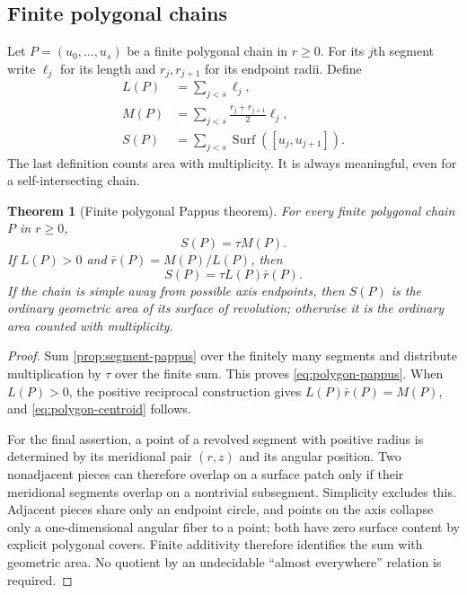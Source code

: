 \documentclass[11pt]{article}
\newtheorem{theorem}{Theorem}[section]
\theoremstyle{definition}
\newcommand{\Surf}{\operatorname{Surf}}
\begin{document}
\subsection{Finite polygonal chains}

Let $P=(u_0,\ldots,u_s)$ be a finite polygonal chain in $r\geq0$.  For its
$j$th segment write $\ell_j$ for its length and $r_j,r_{j+1}$ for its endpoint
radii.  Define
\begin{align}
 L(P)&=\sum_{j<s}\ell_j,\label{eq:poly-length}\\
 M(P)&=\sum_{j<s}\frac{r_j+r_{j+1}}2\ell_j,
 \label{eq:poly-moment}\\
 S(P)&=\sum_{j<s}\Surf([u_j,u_{j+1}]).
 \label{eq:poly-surface}
\end{align}
The last definition counts area with multiplicity.  It is always meaningful,
even for a self-intersecting chain.

\begin{theorem}[Finite polygonal Pappus theorem]
\label{thm:polygon-pappus}
For every finite polygonal chain $P$ in $r\geq0$,
\begin{equation}
 S(P)=\tau M(P).
 \label{eq:polygon-pappus}
\end{equation}
If $L(P)>0$ and $\bar r(P)=M(P)/L(P)$, then
\begin{equation}
 S(P)=\tau L(P)\bar r(P).
 \label{eq:polygon-centroid}
\end{equation}
If the chain is simple away from possible axis endpoints, then $S(P)$ is the
ordinary geometric area of its surface of revolution; otherwise it is the
ordinary area counted with multiplicity.
\end{theorem}

\begin{proof}
Sum \cref{prop:segment-pappus} over the finitely many segments and distribute
multiplication by $\tau$ over the finite sum.  This proves
\eqref{eq:polygon-pappus}.  When $L(P)>0$, the positive reciprocal construction
gives $L(P)\bar r(P)=M(P)$, and \eqref{eq:polygon-centroid} follows.

For the final assertion, a point of a revolved segment with positive radius is
determined by its meridional pair $(r,z)$ and its angular position.  Two
nonadjacent pieces can therefore overlap on a surface patch only if their
meridional segments overlap on a nontrivial subsegment.  Simplicity excludes
this.  Adjacent pieces share only an endpoint circle, and points on the axis
collapse only a one-dimensional angular fiber to a point; both have zero
surface content by explicit polygonal covers.  Finite additivity therefore
identifies the sum with geometric area.  No quotient by an undecidable
``almost everywhere'' relation is required.
\end{proof}
\end{document}
